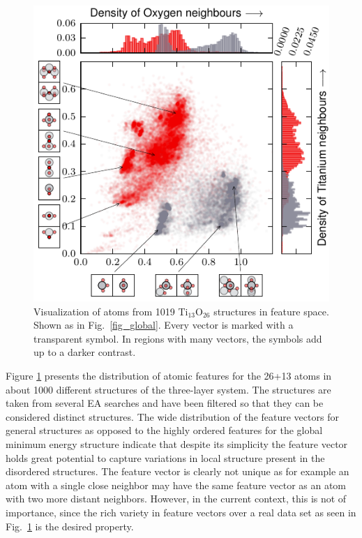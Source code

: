 \documentclass[aip,amsmath,amssymb,reprint]{revtex4-1}
\begin{document}
\begin{figure}[tb]
    \centering
    \includegraphics[width=1.0\columnwidth]{fig3-scatterplot.pdf}
    \caption{Visualization of atoms from 1019 Ti$_{13}$O$_{26}$ structures in feature space. Shown as in Fig.\ \protect\ref{fig_global}. Every vector is
marked with a transparent symbol. In regions with many vectors, the symbols add up to a darker contrast.}
    \label{fig_feature}
\end{figure}

Figure \ref{fig_feature} presents the distribution of atomic features
for the 26+13 atoms in about 1000 different structures of the
three-layer system. The structures are taken from several EA searches
and have been filtered so that they can be considered distinct
structures. The wide distribution of the feature vectors for general
structures as opposed to the highly ordered features for the global
minimum energy structure indicate that despite its simplicity the
feature vector holds great potential to capture variations in local
structure present in the disordered structures. The feature vector is
clearly not unique as for example an atom with a single close neighbor may have the
same feature vector as an atom with two more distant neighbors. However, in the
current context, this is not of importance, since the rich variety in feature
vectors over a real data set as seen in Fig.\  \ref{fig_feature} is the
desired property.
\end{document}
